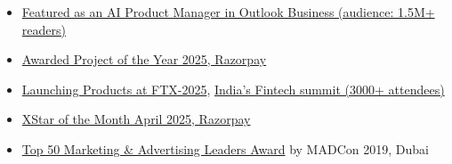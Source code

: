 



\begin{itemize}

 \item [$\blacksquare$] {\color{LightGrey} \color{mecol}\href{https://www.linkedin.com/posts/tarunya-sanjay-683b98248_how-product-managers-in-indias-tech-ecosystem-activity-7363161373981241344-1I_Z }{Featured as an AI Product Manager in Outlook Business (audience: 1.5M+ readers) }}
 
\item [$\blacksquare$] {\color{LightGrey} \color{mecol}\href{https://www.linkedin.com/posts/sarthak-jain24apr98_productmanagement-teamwork-leadership-activity-7357357030069751808-JQp6 }{Awarded Project of the Year 2025, Razorpay}}

\item [$\blacksquare$] {\color{LightGrey} \color{mecol}\href{https://www.linkedin.com/posts/sarthak-jain24apr98_innovation-industryfirst-razorpay-activity-7304150031433879553-D_8t }{Launching Products at FTX-2025}, {\href{https://razorpay.com/ftx/} {India's Fintech summit (3000+ attendees)} }}

\item [$\blacksquare$] {\color{LightGrey} \color{mecol}\href{https://www.linkedin.com/posts/sarthak-jain24apr98_razorpayx-productmanagement-gratitude-activity-7334569930626912256-Mu2I}{XStar of the Month April 2025, Razorpay}}

    \item [$\blacksquare$] {\color{LightGrey} \color{mecol}\href{https://drive.google.com/drive/folders/1W8HZmATotqPVJcRV8dol9LuKinMlSWxu }{Top 50 Marketing \& Advertising Leaders Award} \color{LightGrey}by MADCon 2019,  Dubai}
    
      
     
     
     
      
    
    \end{itemize}

